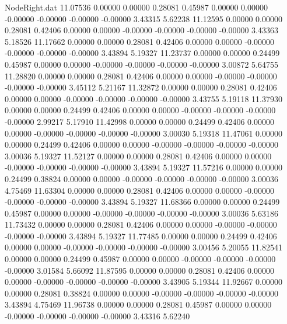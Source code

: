 \begin{filecontents}{NodeRight.dat}
  11.07536    0.00000    0.00000     0.28081    0.45987    0.00000    0.00000   -0.00000   -0.00000   -0.00000   -0.00000    3.43315    5.62238
  11.12595    0.00000    0.00000     0.28081    0.42406    0.00000    0.00000   -0.00000   -0.00000   -0.00000   -0.00000    3.43363    5.18526
  11.17662    0.00000    0.00000     0.28081    0.42406    0.00000    0.00000   -0.00000   -0.00000   -0.00000   -0.00000    3.43894    5.19327
  11.23737    0.00000    0.00000     0.24499    0.45987    0.00000    0.00000   -0.00000   -0.00000   -0.00000   -0.00000    3.00872    5.64755
  11.28820    0.00000    0.00000     0.28081    0.42406    0.00000    0.00000   -0.00000   -0.00000   -0.00000   -0.00000    3.45112    5.21167
  11.32872    0.00000    0.00000     0.28081    0.42406    0.00000    0.00000   -0.00000   -0.00000   -0.00000   -0.00000    3.43755    5.19118
  11.37930    0.00000    0.00000     0.24499    0.42406    0.00000    0.00000   -0.00000   -0.00000   -0.00000   -0.00000    2.99217    5.17910
  11.42998    0.00000    0.00000     0.24499    0.42406    0.00000    0.00000   -0.00000   -0.00000   -0.00000   -0.00000    3.00030    5.19318
  11.47061    0.00000    0.00000     0.24499    0.42406    0.00000    0.00000   -0.00000   -0.00000   -0.00000   -0.00000    3.00036    5.19327
  11.52127    0.00000    0.00000     0.28081    0.42406    0.00000    0.00000   -0.00000   -0.00000   -0.00000   -0.00000    3.43894    5.19327
  11.57216    0.00000    0.00000     0.24499    0.38824    0.00000    0.00000   -0.00000   -0.00000   -0.00000   -0.00000    3.00036    4.75469
  11.63304    0.00000    0.00000     0.28081    0.42406    0.00000    0.00000   -0.00000   -0.00000   -0.00000   -0.00000    3.43894    5.19327
  11.68366    0.00000    0.00000     0.24499    0.45987    0.00000    0.00000   -0.00000   -0.00000   -0.00000   -0.00000    3.00036    5.63186
  11.73432    0.00000    0.00000     0.28081    0.42406    0.00000    0.00000   -0.00000   -0.00000   -0.00000   -0.00000    3.43894    5.19327
  11.77485    0.00000    0.00000     0.24499    0.42406    0.00000    0.00000   -0.00000   -0.00000   -0.00000   -0.00000    3.00456    5.20055
  11.82541    0.00000    0.00000     0.24499    0.45987    0.00000    0.00000   -0.00000   -0.00000   -0.00000   -0.00000    3.01584    5.66092
  11.87595    0.00000    0.00000     0.28081    0.42406    0.00000    0.00000   -0.00000   -0.00000   -0.00000   -0.00000    3.43905    5.19344
  11.92667    0.00000    0.00000     0.28081    0.38824    0.00000    0.00000   -0.00000   -0.00000   -0.00000   -0.00000    3.43894    4.75469
  11.96738    0.00000    0.00000     0.28081    0.45987    0.00000    0.00000   -0.00000   -0.00000   -0.00000   -0.00000    3.43316    5.62240

\end{filecontents}
